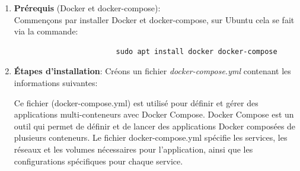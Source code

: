 \documentclass[a4paper,11pt]{article}
\begin{document}
            \bigskip
            \begin{enumerate}
                \item \textbf{Prérequis} (Docker et docker-compose):\\
                \noindent Commençons par installer Docker et docker-compose, sur Ubuntu cela se fait via la commande:
                \begin{tcolorbox}[colback=lightgray!6, colframe=black, left=-30mm, right=5mm, top=2mm, bottom=-2mm, boxrule=0.1mm]
                    \begin{verbatim}
                        sudo apt install docker docker-compose
                    \end{verbatim}
                \end{tcolorbox}
                
                \item \textbf{Étapes d'installation}: 
                \noindent Créons un fichier \textit{docker-compose.yml} contenant les informations suivantes:
                
                \noindent Ce fichier (docker-compose.yml) est utilisé pour définir et gérer des applications multi-conteneurs avec Docker Compose. 
                Docker Compose est un outil qui permet de définir et de lancer des applications Docker composées de plusieurs conteneurs. 
                Le fichier docker-compose.yml spécifie les services, les réseaux et les volumes nécessaires pour l'application, ainsi que les configurations spécifiques pour chaque service.


\end{enumerate}
\end{document}
